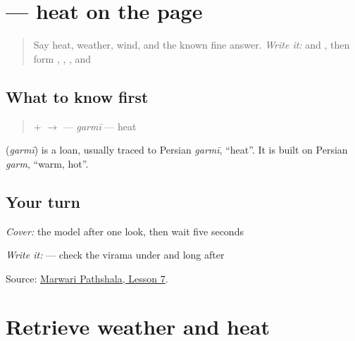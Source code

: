 \section[\texorpdfstring{\mw{गर्मी} (garmī)}{गर्मी (garmī)}]{ — heat on the page}

\label{lesson:MW-C12-garmi}



\begin{quote}
Say heat, weather, wind, and the known fine answer. \emph{Write it:} \textbf{} and \textbf{}, then form \textbf{}, \textbf{}, \textbf{}, and \textbf{}
\end{quote}

\subsection*{What to know first}
\begin{quote}
\textbf{} + \textbf{} $\to$ \textbf{} — \emph{garmī} — heat
\end{quote}

\begin{cousinweb}
\textbf{} (\emph{garmī}) is a loan, usually traced to Persian \emph{garmī}, \textquotedblleft{}heat\textquotedblright{}. It is built on Persian \emph{garm}, \textquotedblleft{}warm, hot\textquotedblright{}.
\end{cousinweb}

\subsection*{Your turn}
\emph{Cover:} the model after one look, then wait five seconds

\emph{Write it:} \textbf{} — check the virama under \textbf{} and long \textbf{} after \textbf{}

\begin{tcolorbox}[breakable,colback=teal!4,colframe=teal!35!black,title={Before you move on}]
Source: \href{https://www.marwaripathshala.com/marwari-lesson-7-english}{Marwari Pathshala, Lesson 7}.
\end{tcolorbox}
\section[Practice]{Retrieve weather and heat}

\label{lesson:MW-R12-weather-first-two}




